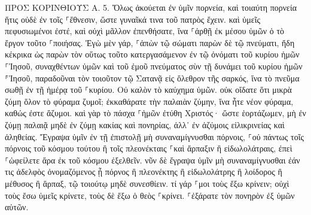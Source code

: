 \documentclass[twoside, 9pt]{extreport}
\begin{document}
ΠΡΟΣ ΚΟΡΙΝΘΙΟΥΣ Α.
5.
Ὅλως ἀκούεται ἐν ὑμῖν πορνεία, καὶ τοιαύτη πορνεία ἥτις οὐδὲ ἐν τοῖς ⸀ἔθνεσιν, ὥστε γυναῖκά τινα τοῦ πατρὸς ἔχειν. 
καὶ ὑμεῖς πεφυσιωμένοι ἐστέ, καὶ οὐχὶ μᾶλλον ἐπενθήσατε, ἵνα ⸀ἀρθῇ ἐκ μέσου ὑμῶν ὁ τὸ ἔργον τοῦτο ⸀ποιήσας. 
Ἐγὼ μὲν γάρ, ⸀ἀπὼν τῷ σώματι παρὼν δὲ τῷ πνεύματι, ἤδη κέκρικα ὡς παρὼν τὸν οὕτως τοῦτο κατεργασάμενον 
ἐν τῷ ὀνόματι τοῦ κυρίου ἡμῶν ⸀Ἰησοῦ, συναχθέντων ὑμῶν καὶ τοῦ ἐμοῦ πνεύματος σὺν τῇ δυνάμει τοῦ κυρίου ἡμῶν ⸁Ἰησοῦ, 
παραδοῦναι τὸν τοιοῦτον τῷ Σατανᾷ εἰς ὄλεθρον τῆς σαρκός, ἵνα τὸ πνεῦμα σωθῇ ἐν τῇ ἡμέρᾳ τοῦ ⸀κυρίου. 
Οὐ καλὸν τὸ καύχημα ὑμῶν. οὐκ οἴδατε ὅτι μικρὰ ζύμη ὅλον τὸ φύραμα ζυμοῖ; 
ἐκκαθάρατε τὴν παλαιὰν ζύμην, ἵνα ἦτε νέον φύραμα, καθώς ἐστε ἄζυμοι. καὶ γὰρ τὸ πάσχα ⸀ἡμῶν ἐτύθη Χριστός· 
ὥστε ἑορτάζωμεν, μὴ ἐν ζύμῃ παλαιᾷ μηδὲ ἐν ζύμῃ κακίας καὶ πονηρίας, ἀλλ᾽ ἐν ἀζύμοις εἰλικρινείας καὶ ἀληθείας. 
Ἔγραψα ὑμῖν ἐν τῇ ἐπιστολῇ μὴ συναναμίγνυσθαι πόρνοις, 
⸀οὐ πάντως τοῖς πόρνοις τοῦ κόσμου τούτου ἢ τοῖς πλεονέκταις ⸀καὶ ἅρπαξιν ἢ εἰδωλολάτραις, ἐπεὶ ⸀ὠφείλετε ἄρα ἐκ τοῦ κόσμου ἐξελθεῖν. 
νῦν δὲ ἔγραψα ὑμῖν μὴ συναναμίγνυσθαι ἐάν τις ἀδελφὸς ὀνομαζόμενος ᾖ πόρνος ἢ πλεονέκτης ἢ εἰδωλολάτρης ἢ λοίδορος ἢ μέθυσος ἢ ἅρπαξ, τῷ τοιούτῳ μηδὲ συνεσθίειν. 
τί γάρ ⸀μοι τοὺς ἔξω κρίνειν; οὐχὶ τοὺς ἔσω ὑμεῖς κρίνετε, 
τοὺς δὲ ἔξω ὁ θεὸς ⸀κρίνει. ⸀ἐξάρατε τὸν πονηρὸν ἐξ ὑμῶν αὐτῶν. 
\end{document}
